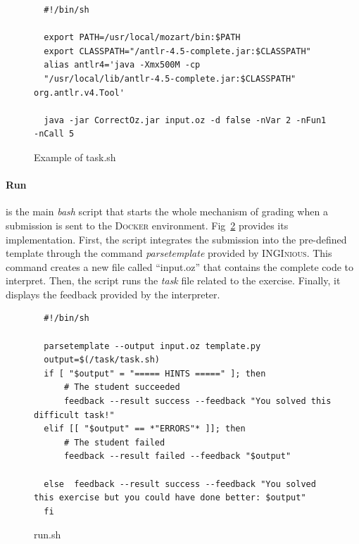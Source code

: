 \documentclass[11pt,a4paper,twoside,openright]{report}
\begin{document}
\begin{figure}[!ht]
  \begin{lstlisting}
  #!/bin/sh

  export PATH=/usr/local/mozart/bin:$PATH
  export CLASSPATH="/antlr-4.5-complete.jar:$CLASSPATH"
  alias antlr4='java -Xmx500M -cp 
  "/usr/local/lib/antlr-4.5-complete.jar:$CLASSPATH" org.antlr.v4.Tool'

  java -jar CorrectOz.jar input.oz -d false -nVar 2 -nFun1 -nCall 5
  \end{lstlisting}
  \caption{Example of task.sh}
  \label{fig:task}
\end{figure}

\paragraph{Run}
is the main \textit{bash} script that starts the whole mechanism of grading 
when a submission is sent to the \textsc{Docker} environment. Fig~\ref{fig:run} 
provides its implementation. First, the script integrates the submission into 
the pre-defined template through the command \textit{parsetemplate} provided 
by \textsc{INGInious}. This command creates a new file called 
\enquote{input.oz} that contains the complete code to interpret. Then, the 
script runs the \textit{task} file related to the exercise. Finally, it displays 
the feedback provided by the interpreter.\\

\begin{figure}[!ht]
  \begin{lstlisting}
  #!/bin/sh
  
  parsetemplate --output input.oz template.py
  output=$(/task/task.sh)
  if [ "$output" = "===== HINTS =====" ]; then
	  # The student succeeded
	  feedback --result success --feedback "You solved this difficult task!"
  elif [[ "$output" == *"ERRORS"* ]]; then
	  # The student failed
	  feedback --result failed --feedback "$output"
		  
  else	feedback --result success --feedback "You solved this exercise but you could have done better: $output"
  fi
  \end{lstlisting}
  \caption{run.sh}
  \label{fig:run}
\end{figure}
\end{document}
